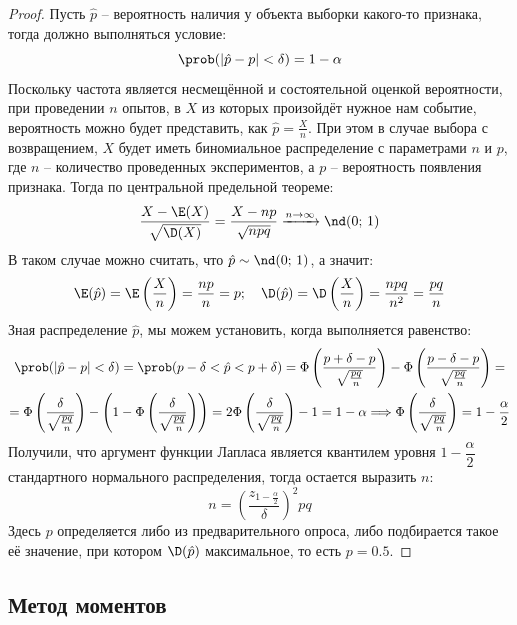 \documentclass[12pt]{article}
\begin{document}
\begin{proof}
    Пусть $\hat{p}$ – вероятность наличия у объекта выборки какого-то признака, тогда должно выполняться условие:
    $$\prob(|\hat{p}-p|<\delta)=1-\alpha$$
    Поскольку частота является несмещённой и состоятельной оценкой вероятности, при проведении $n$ опытов, в $X$ из которых произойдёт нужное нам событие, вероятность можно будет представить, как $\hat{p}=\frac{X}{n}$. При этом в случае выбора с возвращением, $X$ будет иметь биномиальное распределение с параметрами $n$ и $p$, где $n$ – количество проведенных экспериментов, а $p$ – вероятность появления признака. Тогда по центральной предельной теореме:
    $$\frac{X-\E(X)}{\sqrt{\D(X)}}=\frac{X-np}{\sqrt{npq}}\xrightarrow{n\to\infty}\nd(0;\,1)$$
    В таком случае можно считать, что $\hat{p}\sim\nd(0;\,1)$, а значит:
    $$\E(\hat{p})=\E\left(\frac{X}{n}\right)=\frac{np}{n}=p;\quad\D(\hat{p})=\D\left(\frac{X}{n}\right)=\frac{npq}{n^2}=\frac{pq}{n}$$
    Зная распределение $\hat{p}$, мы можем установить, когда выполняется равенство:
    \begin{multline*}
        \prob(|\hat{p}-p|<\delta)=\prob(p-\delta<\hat{p}<p+\delta)=\Phi\left(\frac{p+\delta-p}{\sqrt{\frac{pq}{n}}}\right) - \Phi\left(\frac{p-\delta-p}{\sqrt{\frac{pq}{n}}}\right)=\\
        =\Phi\left(\frac{\delta}{\sqrt{\frac{pq}{n}}}\right) - \left(1 - \Phi\left(\frac{\delta}{\sqrt{\frac{pq}{n}}}\right)\right)=2\Phi\left(\frac{\delta}{\sqrt{\frac{pq}{n}}}\right)-1=1-\alpha\Longrightarrow \Phi\left(\frac{\delta}{\sqrt{\frac{pq}{n}}}\right) = 1-\frac{\alpha}{2}
    \end{multline*}
    Получили, что аргумент функции Лапласа является квантилем уровня $1-\dfrac{\alpha}{2}$ стандартного нормального распределения, тогда остается выразить $n$:
    $$n=\left(\frac{z_{1-\frac{\alpha}{2}}}{\delta}\right)^2pq$$
    Здесь $p$ определяется либо из предварительного опроса, либо подбирается такое её значение, при котором $\D(\hat{p})$ максимальное, то есть $p=\num{0.5}$.
\end{proof}

\subsection{Метод моментов}
\end{document}
